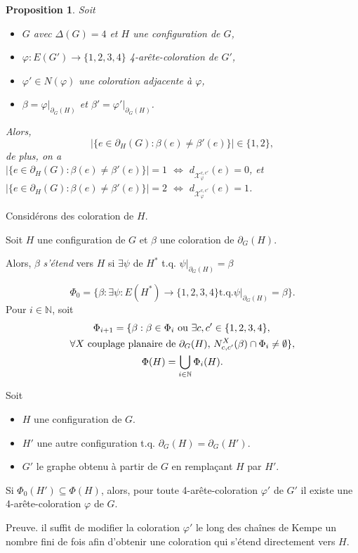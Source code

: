 \documentclass{beamer}
\newtheorem{proposition}{Proposition}
\begin{document}
\begin{frame}
\begin{proposition}
Soit 
\begin{itemize}
\item $G$ avec $\Delta(G)=4$ et $H$ une configuration de $G$,
\item $\varphi:E(G')\to \{1,2,3,4\}$ 4-arête-coloration de $G'$, 
\item $\varphi' \in N(\varphi)$ une coloration adjacente à $\varphi$,
\item $\beta = \varphi|_{\partial_G(H)}$ et $\beta' = \varphi'|_{\partial_G(H)}$.
\end{itemize}
Alors,
$$
|\{e\in \partial_H(G) : \beta(e)\ne \beta'(e)\}| \in \{1,2\},
$$
de plus, on a \\
$|\{e\in \partial_H(G) : \beta(e)\ne \beta'(e)\}|=1$ $\Leftrightarrow$ $d_{\mathcal{X}_{\varphi}^{c,c'}}(e)=0$, et \\
$|\{e\in \partial_H(G) : \beta(e)\ne \beta'(e)\}|=2$ $\Leftrightarrow$ $d_{\mathcal{X}_{\varphi}^{c,c'}}(e)=1$. 
\end{proposition}
\end{frame}

\begin{frame}
Considérons des coloration de $H$.
\end{frame}

\begin{frame}
Soit $H$ une configuration de $G$ et $\beta$ une coloration de $\partial_G(H)$. 

Alors, $\beta$ \emph{s'étend} vers $H$ si $\exists \psi$ de $H^*$  t.q.   $\psi|_{\partial_G(H)}= \beta$

$$
\Phi_0 = \{\beta : \exists \psi : E(H^*)\to\{1,2,3,4\} \textrm{t.q.} \psi|_{\partial_G(H)} = \beta\}.
$$
Pour $i\in\mathbb{N}$, soit
$$
\gathered
\Phi_{i+1} = 
\{ 
\beta : 
\beta\in \Phi_i
\textrm{ ou }
\exists c,c'\in \{1,2,3,4\},\,\\ 
\forall X\textrm{ couplage planaire de $\partial_G(H)$, }
N^X_{c,c'}(\beta) \cap \Phi_i \neq \emptyset 
\},\\
\Phi(H)=\bigcup_{i\in \mathbb{N}} \Phi_i(H).
\endgathered
$$
\end{frame}

\begin{frame}
\begin{theorem}
Soit 
\begin{itemize}
\item $H$ une configuration de $G$. 
\item $H'$ une autre configuration t.q. $\partial_G(H)=\partial_G(H')$.
\item $G'$ le graphe obtenu à partir de $G$ en remplaçant $H$ par $H'$.
\end{itemize}

Si $\Phi_0(H')\subseteq \Phi(H)$, alors, pour toute 4-arête-coloration $\varphi'$ de $G'$ il existe une 4-arête-coloration $\varphi$ de $G$.
\end{theorem}

Preuve.
il suffit de modifier la coloration $\varphi'$ le long des chaînes de Kempe un nombre fini de fois afin d'obtenir une coloration qui s'étend directement vers $H$.
\end{frame}
\end{document}
